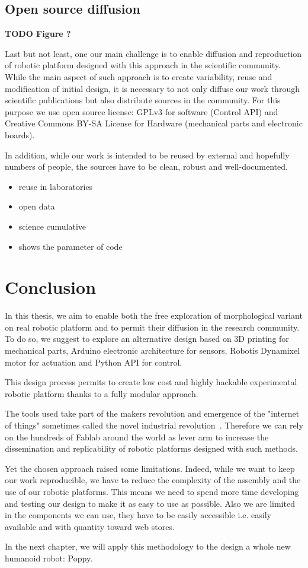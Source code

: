 \subsection{Open source diffusion} %

\textbf{TODO Figure ?}

Last but not least, one our main challenge is to enable diffusion and reproduction of robotic platform designed with this approach in the scientific community. While the main aspect of such approach is to create variability, reuse and modification of initial design, it is necessary to not only diffuse our work through scientific publications but also distribute sources in the community. For this purpose we use open source license: GPLv3 for software (Control API) and Creative Commons BY-SA License for Hardware (mechanical parts and electronic boards).

In addition, while our work is intended to be reused by external and hopefully numbers of people, the sources have to be clean, robust and well-documented.


\begin{itemize}
    \item reuse in laboratories
    \item open data
    \item science cumulative
    \item shows the parameter of code
\end{itemize}


\section{Conclusion} %

In this thesis, we aim to enable both the free exploration of morphological variant on real robotic platform and to permit their diffusion in the research community. To do so, we suggest to explore an alternative design based on 3D printing for mechanical parts, Arduino electronic architecture for sensors, Robotis Dynamixel motor for actuation and Python API for control.

This design process permits to create low cost and highly hackable experimental robotic platform thanks to a fully modular approach.

The tools used take part of the makers revolution and emergence of the "internet of things" sometimes called the novel industrial revolution~\cite{anderson}. Therefore we can rely on the hundreds of Fablab around the world as lever arm to increase the dissemination and replicability of robotic platforms designed with such methods.

Yet the chosen approach raised some limitations. Indeed, while we want to keep our work reproducible, we have to reduce the complexity of the assembly and the use of our robotic platforms. This means we need to spend more time developing and testing our design to make it as easy to use as possible. Also we are limited in the components we can use, they have to be easily accessible i.e. easily available and with quantity toward web stores.


In the next chapter, we will apply this methodology to the design a whole new humanoid robot: Poppy.


